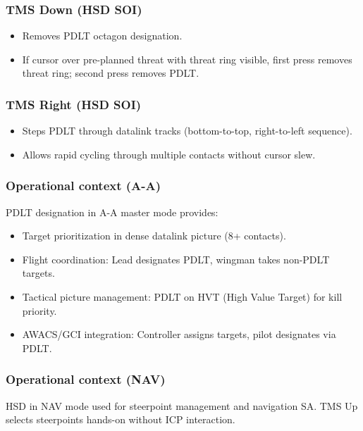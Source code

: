 \documentclass[11pt, a4paper, twoside]{report}
\begin{document}
\subsubsection*{TMS Down (HSD SOI)}
\label{sec:C4-S2-S1-S2}

\begin{itemize}[nosep]
	\item Removes PDLT octagon designation.
	\item If cursor over pre-planned threat with threat ring visible, first press removes 
	threat ring; second press removes PDLT.
\end{itemize}

\subsubsection*{TMS Right (HSD SOI)}
\label{sec:C4-S2-S1-S3}

\begin{itemize}[nosep]
	\item Steps PDLT through datalink tracks (bottom-to-top, right-to-left sequence).
	\item Allows rapid cycling through multiple contacts without cursor slew.
\end{itemize}

\subsubsection*{Operational context (A-A)}
\label{sec:C4-S2-S1-S4}

PDLT designation in A-A master mode provides:
\begin{itemize}[nosep]
	\item Target prioritization in dense datalink picture (8+ contacts).
	\item Flight coordination: Lead designates PDLT, wingman takes non-PDLT targets.
	\item Tactical picture management: PDLT on HVT (High Value Target) for kill priority.
	\item AWACS/GCI integration: Controller assigns targets, pilot designates via PDLT.
\end{itemize}

\subsubsection*{Operational context (NAV)}
\label{sec:C4-S2-S1-S5}

HSD in NAV mode used for steerpoint management and navigation SA. TMS Up selects 
steerpoints hands-on without ICP interaction.
\end{document}
